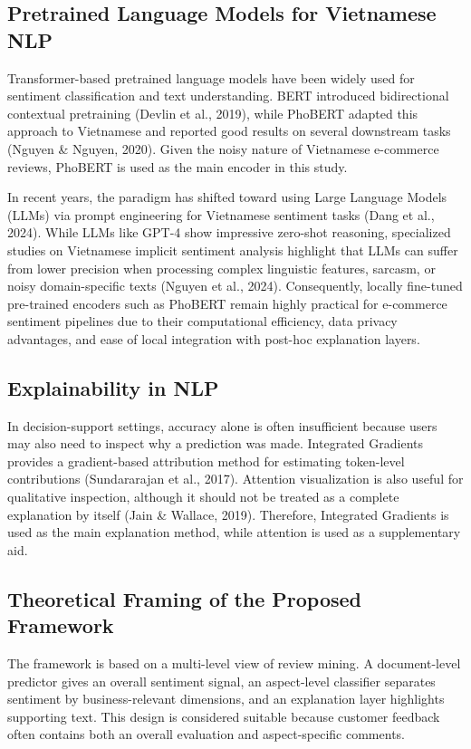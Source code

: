 \documentclass[a4paper,12pt]{extarticle}
\begin{document}
\subsection{Pretrained Language Models for Vietnamese NLP}

Transformer-based pretrained language models have been widely used for sentiment classification and text understanding. BERT introduced bidirectional contextual pretraining (Devlin et al., 2019), while PhoBERT adapted this approach to Vietnamese and reported good results on several downstream tasks (Nguyen \& Nguyen, 2020). Given the noisy nature of Vietnamese e-commerce reviews, PhoBERT is used as the main encoder in this study.


In recent years, the paradigm has shifted toward using Large Language Models (LLMs) via prompt engineering for Vietnamese sentiment tasks (Dang et al., 2024). While LLMs like GPT-4 show impressive zero-shot reasoning, specialized studies on Vietnamese implicit sentiment analysis highlight that LLMs can suffer from lower precision when processing complex linguistic features, sarcasm, or noisy domain-specific texts (Nguyen et al., 2024). Consequently, locally fine-tuned pre-trained encoders such as PhoBERT remain highly practical for e-commerce sentiment pipelines due to their computational efficiency, data privacy advantages, and ease of local integration with post-hoc explanation layers.


\subsection{Explainability in NLP}

In decision-support settings, accuracy alone is often insufficient because users may also need to inspect why a prediction was made. Integrated Gradients provides a gradient-based attribution method for estimating token-level contributions (Sundararajan et al., 2017). Attention visualization is also useful for qualitative inspection, although it should not be treated as a complete explanation by itself (Jain \& Wallace, 2019). Therefore, Integrated Gradients is used as the main explanation method, while attention is used as a supplementary aid.

\subsection{Theoretical Framing of the Proposed Framework}

The framework is based on a multi-level view of review mining. A document-level predictor gives an overall sentiment signal, an aspect-level classifier separates sentiment by business-relevant dimensions, and an explanation layer highlights supporting text. This design is considered suitable because customer feedback often contains both an overall evaluation and aspect-specific comments.
\end{document}
